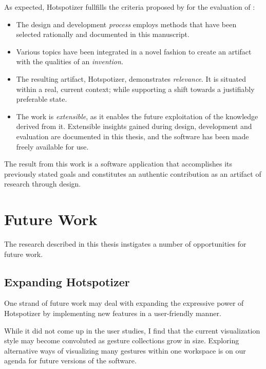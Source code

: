 As expected, Hotspotizer fullfills the criteria proposed by \textcite{Zimmerman:2007} for the evaluation of  \parencite{Frayling:1993}:

\begin{itemize}
\item The design and development \emph{process} employs methods that have been selected rationally and documented in this manuscript.
\item Various topics have been integrated in a novel fashion to create an artifact with the qualities of an \emph{invention.}
\item The resulting artifact, Hotspotizer, demonstrates \emph{relevance}. It is situated within a real, current context; while supporting a shift towards a justifiably preferable state.
\item The work is \emph{extensible}, as it enables the future exploitation of the knowledge derived from it. Extensible insights gained during design, development and evaluation are documented in this thesis, and the software has been made freely available for use.
\end{itemize}

The result from this work is a software application that accomplishes its previously stated goals and constitutes an authentic contribution as an artifact of research through design.

\section{Future Work}
\label{sec:future-work}

The research described in this thesis instigates a number of opportunities for future work.

\subsection{Expanding Hotspotizer}

One strand of future work may deal with expanding the expressive power of Hotspotizer by implementing new features in a user-friendly manner.

While it did not come up in the user studies, I find that the current visualization style may become convoluted as gesture collections grow in size. Exploring alternative ways of visualizing many gestures within one workspace is on our agenda for future versions of the software.

